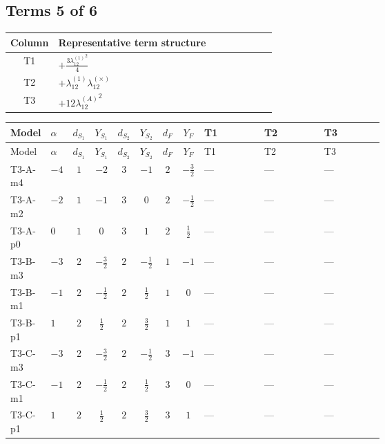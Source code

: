 \documentclass[8pt]{article}
\begin{document}
\begin{landscape}
\subsection*{Terms 5 of 6}
\begin{center}
\begin{tabular}{@{}c >{\raggedright\arraybackslash}p{0.82\linewidth}@{}}
\toprule
Column & Representative term structure \\
\midrule
T1 & \(\displaystyle +\frac{3 {\lambda_{12}^{(1)}}^2}{4}\) \\
\midrule
T2 & \(\displaystyle +{\lambda_{12}^{(1)}} {\lambda_{12}^{(\times)}}\) \\
\midrule
T3 & \(\displaystyle +12 {\lambda_{12}^{(A)}}^2\) \\
\midrule
\bottomrule
\end{tabular}
\end{center}
\smallskip
\tiny
\begin{longtable}{@{}llcccccc >{\raggedright\arraybackslash}p{0.21\linewidth} >{\raggedright\arraybackslash}p{0.21\linewidth} >{\raggedright\arraybackslash}p{0.21\linewidth}@{}}
\toprule
Model & $\alpha$ & $d_{S_1}$ & $Y_{S_1}$ & $d_{S_2}$ & $Y_{S_2}$ & $d_F$ & $Y_F$ & T1 & T2 & T3 \\
\midrule
\endfirsthead
\toprule
Model & $\alpha$ & $d_{S_1}$ & $Y_{S_1}$ & $d_{S_2}$ & $Y_{S_2}$ & $d_F$ & $Y_F$ & T1 & T2 & T3 \\
\midrule
\endhead
T3-A-m4 & $-4$ & $1$ & $-2$ & $3$ & $-1$ & $2$ & $-\frac{3}{2}$ & --- & --- & --- \\
\midrule
T3-A-m2 & $-2$ & $1$ & $-1$ & $3$ & $0$ & $2$ & $-\frac{1}{2}$ & --- & --- & --- \\
\midrule
T3-A-p0 & $0$ & $1$ & $0$ & $3$ & $1$ & $2$ & $\frac{1}{2}$ & --- & --- & --- \\
\midrule
T3-B-m3 & $-3$ & $2$ & $-\frac{3}{2}$ & $2$ & $-\frac{1}{2}$ & $1$ & $-1$ & --- & --- & --- \\
\midrule
T3-B-m1 & $-1$ & $2$ & $-\frac{1}{2}$ & $2$ & $\frac{1}{2}$ & $1$ & $0$ & --- & --- & --- \\
\midrule
T3-B-p1 & $1$ & $2$ & $\frac{1}{2}$ & $2$ & $\frac{3}{2}$ & $1$ & $1$ & --- & --- & --- \\
\midrule
T3-C-m3 & $-3$ & $2$ & $-\frac{3}{2}$ & $2$ & $-\frac{1}{2}$ & $3$ & $-1$ & --- & --- & --- \\
\midrule
T3-C-m1 & $-1$ & $2$ & $-\frac{1}{2}$ & $2$ & $\frac{1}{2}$ & $3$ & $0$ & --- & --- & --- \\
\midrule
T3-C-p1 & $1$ & $2$ & $\frac{1}{2}$ & $2$ & $\frac{3}{2}$ & $3$ & $1$ & --- & --- & --- \\

\end{longtable}
\end{landscape}
\end{document}
